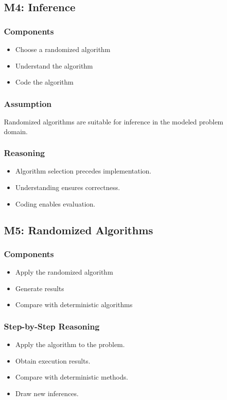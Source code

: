 \documentclass[12pt]{article}
\begin{document}
\subsection{M4: Inference}

\subsubsection{Components}
\begin{itemize}
    \item Choose a randomized algorithm
    \item Understand the algorithm
    \item Code the algorithm
\end{itemize}

\subsubsection{Assumption}
Randomized algorithms are suitable for inference in the modeled problem domain.

\subsubsection{Reasoning}
\begin{itemize}
    \item Algorithm selection precedes implementation.
    \item Understanding ensures correctness.
    \item Coding enables evaluation.
\end{itemize}

\subsection{M5: Randomized Algorithms}

\subsubsection{Components}
\begin{itemize}
    \item Apply the randomized algorithm
    \item Generate results
    \item Compare with deterministic algorithms
\end{itemize}

\subsubsection{Step-by-Step Reasoning}
\begin{itemize}
    \item Apply the algorithm to the problem.
    \item Obtain execution results.
    \item Compare with deterministic methods.
    \item Draw new inferences.
\end{itemize}
\end{document}
